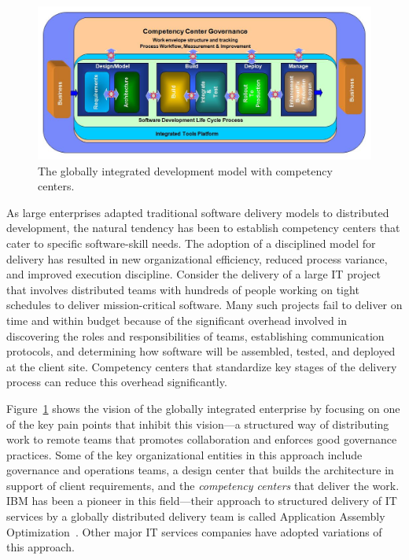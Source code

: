 \begin{figure}[t]
\centering
\includegraphics[bb= 28 0 740 355, scale=0.32]{figs/glocomp.jpg}
\vspace*{-13pt}
\caption{The globally integrated development model with competency centers.}
\vspace*{-16pt}
\label{glofig1}
\end{figure}

As large enterprises adapted traditional software delivery models to distributed
development, the natural tendency has been to establish competency centers that
cater to specific software-skill needs. The adoption of a disciplined model for
delivery has resulted in new organizational efficiency, reduced process
variance, and improved execution discipline. Consider the delivery of a large IT
project that involves distributed teams with hundreds of people working on tight
schedules to deliver mission-critical software. Many such projects fail to
deliver on time and within budget because of the significant overhead involved
in discovering the roles and responsibilities of teams, establishing
communication protocols, and determining how software will be assembled, tested,
and deployed at the client site. Competency centers that standardize key stages
of the delivery process
can reduce this overhead significantly.

Figure~\ref{glofig1} shows the vision of the globally integrated enterprise by
focusing on one of the key pain points that inhibit this vision---a structured
way of distributing work to remote teams that promotes collaboration and
enforces good governance practices.  Some of the key organizational entities in
this approach include governance and operations teams, a design center that
builds the architecture in support of client requirements, and the
\textit{competency centers} that deliver the work. IBM has been a pioneer in
this field---their approach to structured delivery of IT services by a globally
distributed delivery team is called Application Assembly
Optimization~\cite{gloaao}. Other major IT services companies have adopted
variations of this approach.

